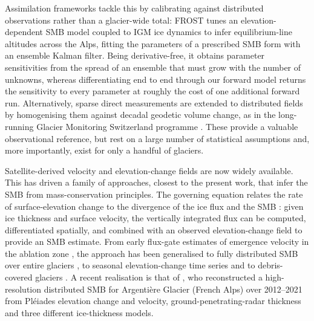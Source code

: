 Assimilation frameworks tackle this by calibrating against distributed observations rather than a glacier-wide total: FROST \citep{herrmann2025} tunes an elevation-dependent SMB model coupled to IGM ice dynamics to infer equilibrium-line altitudes across the Alps, fitting the parameters of a prescribed SMB form with an ensemble Kalman filter. Being derivative-free, it obtains parameter sensitivities from the spread of an ensemble that must grow with the number of unknowns, whereas differentiating end to end through our forward model returns the sensitivity to every parameter at roughly the cost of one additional forward run.
Alternatively, sparse direct measurements are extended to distributed fields by homogenising them against decadal geodetic volume change, as in the long-running Glacier Monitoring Switzerland programme \citep[GLAMOS;][]{glamos}. These provide a valuable observational reference, but rest on a large number of statistical assumptions and, more importantly, exist for only a handful of glaciers.

Satellite-derived velocity and elevation-change fields are now widely available. This has driven a family of approaches, closest to the present work, that infer the SMB from mass-conservation principles. The governing equation relates the rate of surface-elevation change to the divergence of the ice flux and the SMB \citep{cuffey2010}: given ice thickness and surface velocity, the vertically integrated flux can be computed, differentiated spatially, and combined with an observed elevation-change field to provide an SMB estimate. From early flux-gate estimates of emergence velocity in the ablation zone \citep{berthier2012, brun2018, kneib2022}, the approach has been generalised to fully distributed SMB over entire glaciers \citep{bisset2020, miles2021, pelto2021, vantricht2021}, to seasonal elevation-change time series \citep{zeller2023} and to debris-covered glaciers \citep{bhushan2024}. A recent realisation is that of \citet{kneib2024}, who reconstructed a high-resolution distributed SMB for Argentière Glacier (French Alps) over 2012--2021 from Pléiades elevation change and velocity, ground-penetrating-radar thickness and three different ice-thickness models.

